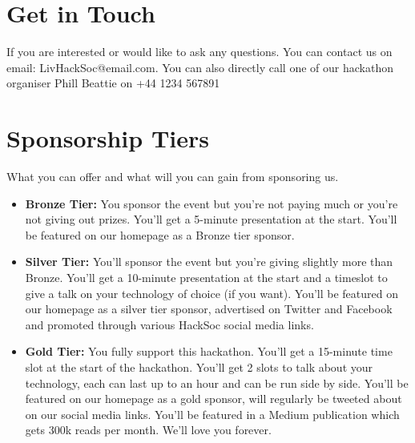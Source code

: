 \documentclass{report}
\begin{document}
    
    \section *{Get in Touch}
    If you are interested or would like to ask any questions. You can contact us on email: \textcolor{MyLinkBlue}{LivHackSoc@email.com}. You can also directly call one of our hackathon organiser Phill Beattie on \textcolor{MyLinkBlue}{+44 1234 567891}

    \pagebreak

    \section *{Sponsorship Tiers}
    What you can offer and what will you can gain from sponsoring us. \\

    \begin{itemize} 
        \item \textbf{Bronze Tier:} You sponsor the event but you're not paying much or you're not giving out prizes. You'll get a 5-minute presentation at the start. You'll be featured on our homepage as a Bronze tier sponsor.

        \item \textbf{Silver Tier:} You'll sponsor the event but you're giving slightly more than Bronze. You'll get a 10-minute presentation at the start and a timeslot to give a talk on your technology of choice (if you want). You'll be featured on our homepage as a silver tier sponsor, advertised on Twitter and Facebook and promoted through various HackSoc social media links.

        \item \textbf{Gold Tier:} You fully support this hackathon.  You'll get a 15-minute time slot at the start of the hackathon. You'll get 2 slots to talk about your technology, each can last up to an hour and can be run side by side. You'll be featured on our homepage as a gold sponsor, will regularly be tweeted about on our social media links. You'll be featured in a Medium publication which gets 300k reads per month. We'll love you forever.
    \end{itemize}
    
    
\end{document}

